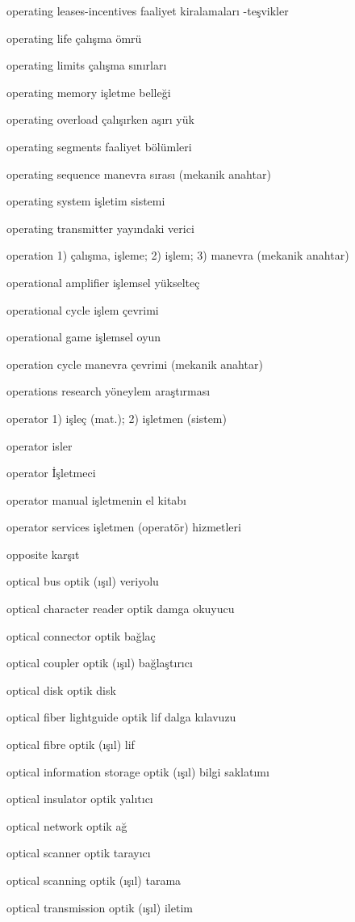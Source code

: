 \documentclass[12pt,fleqn]{article}\usepackage{../../common}
\begin{document}
operating leases-incentives faaliyet kiralamaları -teşvikler

operating life çalışma ömrü

operating limits çalışma sınırları

operating memory işletme belleği

operating overload çalışırken aşırı yük

operating segments faaliyet bölümleri

operating sequence manevra sırası (mekanik anahtar)

operating system işletim sistemi

operating transmitter yayındaki verici

operation 1) çalışma, işleme; 2) işlem; 3) manevra (mekanik anahtar)

operational amplifier işlemsel yükselteç

operational cycle işlem çevrimi

operational game işlemsel oyun

operation cycle manevra çevrimi (mekanik anahtar)

operations research yöneylem araştırması

operator 1) işleç (mat.); 2) işletmen (sistem)

operator isler

operator İşletmeci

operator manual işletmenin el kitabı

operator services işletmen (operatör) hizmetleri

opposite karşıt

optical bus optik (ışıl) veriyolu

optical character reader optik damga okuyucu

optical connector optik bağlaç

optical coupler optik (ışıl) bağlaştırıcı

optical disk optik disk

optical fiber lightguide optik lif dalga kılavuzu

optical fibre optik (ışıl) lif

optical information storage optik (ışıl) bilgi saklatımı

optical insulator optik yalıtıcı

optical network optik ağ

optical scanner optik tarayıcı

optical scanning optik (ışıl) tarama

optical transmission optik (ışıl) iletim
\end{document}

